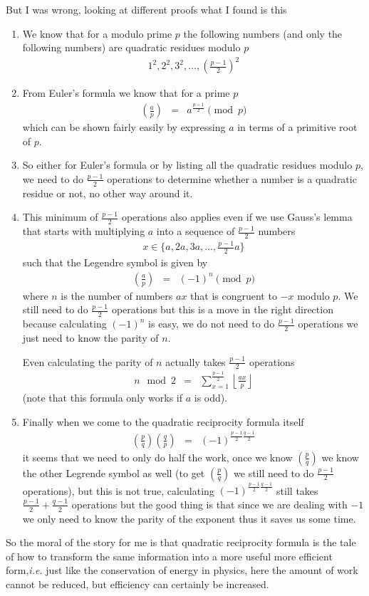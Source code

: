 \documentclass[aps,preprint,preprintnumbers,nofootinbib,showpacs,prd]{revtex4-1}
\newcommand{\ie}{{\it i.e.} }
\newcommand{\nbea}{\begin{eqnarray*}}
\newcommand{\neea}{\end{eqnarray*}}
\begin{document}
But I was wrong, looking at different proofs what I found is this
%
\begin{enumerate}
%
\item We know that for a modulo prime $p$ the following numbers (and only the following numbers) are quadratic residues modulo $p$
%
\nbea
1^2,2^2,3^2,\dots,\left(\frac{p-1}{2}\right)^2
\neea
%
\item From Euler's formula we know that for a prime $p$
%
\nbea
\left(\frac{a}{p}\right) & = & a^{\frac{p-1}{2}} \pmod{p}
\neea
%
which can be shown fairly easily by expressing $a$ in terms of a primitive root of $p$.
%
\item So either for Euler's formula or by listing all the quadratic residues modulo $p$, we need to do $\frac{p-1}{2}$ operations to determine whether a number is a quadratic residue or not, no other way around it.
%
\item This minimum of $\frac{p-1}{2}$ operations also applies even if we use Gauss's lemma that starts with multiplying $a$ into a sequence of $\frac{p-1}{2}$ numbers
%
\nbea
x\in \{a,2a,3a,\dots, \frac{p-1}{2} a\}
\neea
%
such that the Legendre symbol is given by
%
\nbea
\left(\frac{a}{p}\right) & = & (-1)^n \pmod{p}
\neea
%
where $n$ is the number of numbers $ax$ that is congruent to $-x$ modulo $p$. We still need to do $\frac{p-1}{2}$ operations but this is a move in the right direction because calculating $(-1)^n$ is easy, we do not need to do $\frac{p-1}{2}$ operations we just need to know the parity of $n$.

Even calculating the parity of $n$ actually takes $\frac{p-1}{2}$ operations
%
\nbea
n \mod 2 & = & \sum_{x=1}^{\frac{p-1}{2}} \left \lfloor \frac{ax}{p} \right \rfloor
\neea
%
(note that this formula only works if $a$ is odd).
%
\item Finally when we come to the quadratic reciprocity formula itself
%
\nbea
\left(\frac{p}{q}\right)\left(\frac{q}{p}\right) & = & (-1)^{\frac{p-1}{2}\frac{q-1}{2}}
\neea
%
it seems that we need to only do half the work, once we know $\left(\frac{p}{q}\right)$ we know the other Legrende symbol as well (to get $\left(\frac{p}{q}\right)$ we still need to do $\frac{p-1}{2}$ operations), but this is not true, calculating $(-1)^{\frac{p-1}{2}\frac{q-1}{2}}$ still takes ${\frac{p-1}{2} + \frac{q-1}{2}}$ operations but the good thing is that since we are dealing with $-1$ we only need to know the parity of the exponent thus it saves us some time.
%
\end{enumerate}
%
So the moral of the story for me is that quadratic reciprocity formula is the tale of how to transform the same information into a more useful more efficient form,\ie just like the conservation of energy in physics, here the amount of work cannot be reduced, but efficiency can certainly be increased.
\end{document}
